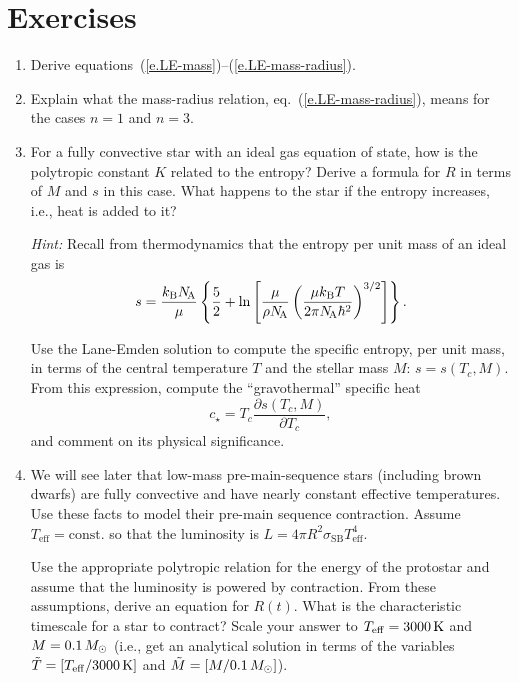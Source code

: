 \section{Exercises}\label{s.LE-exercises}
\begin{enumerate}
\item Derive equations~(\ref{e.LE-mass})--(\ref{e.LE-mass-radius}).

\item Explain what the mass-radius relation, eq.~(\ref{e.LE-mass-radius}), means for the cases $n=1$ and $n=3$.

\item For a fully convective star with an ideal gas equation of state, how is the polytropic constant $K$ related to the entropy? Derive a formula for $R$ in terms of $M$ and $s$ in this case.  What happens to the star if the entropy increases, i.e., heat is added to it?

\emph{Hint:} Recall from thermodynamics that the entropy per unit mass of an ideal gas is
\begin{equation}\label{e.exercise-entropy}
s = \frac{k_\mathrm{B} N_\mathrm{\!A}}{\mu}\left\{ \frac{5}{2} + \ln\left[\frac{\mu}{\rho N_\mathrm{\!A}}\left(\frac{\mu k_\mathrm{B} T}{2\pi N_\mathrm{\!A}\hbar^{2}}\right)^{3/2}\right]\right\}.
\end{equation}

Use the Lane-Emden solution to compute the specific entropy, per unit mass, in terms of the central temperature $T$ and the stellar mass $M$: $s = s(T_{c},M)$.  From this expression,  compute the ``gravothermal'' specific heat
\begin{equation}\label{e.cstar}
c_{\star} = T_{c}\frac{\partial s(T_{c},M)}{\partial T_{c}},
\end{equation}
and comment on its physical significance.

\item We will see later that low-mass pre-main-sequence stars (including brown dwarfs) are fully convective and have nearly constant effective temperatures.  Use these facts to model their pre-main sequence contraction.  Assume $T_{\mathrm{eff}} = \mathrm{const.}$ so that the luminosity is $L = 4\pi R^{2} \sigma_{\mathrm{SB}} T_{\mathrm{eff}}^{4}$.

Use the appropriate polytropic relation for the energy of the protostar and assume that the luminosity is powered by contraction. From these assumptions, derive an equation for $R(t)$. What is the characteristic timescale for a star to contract? Scale your answer to $T_{\mathrm{eff}} = 3000\,\mathrm{K}$ and $M = 0.1\,M_\odot$ (i.e., get an analytical solution in terms of the variables $\tilde{T} = [T_{\mathrm{eff}}/3000\,\mathrm{K}]$ and $\tilde{M} = [M/0.1\,M_\odot]$).


\end{enumerate}
